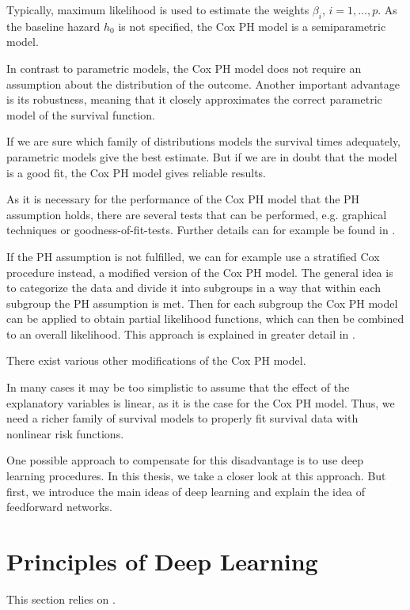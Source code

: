 \documentclass[12pt, a4paper]{scrartcl}
\theoremstyle{definition}
\theoremstyle{plain}
\numberwithin{equation}{section}
\numberwithin{figure}{section}
\numberwithin{table}{section}
\begin{document}
	Typically, maximum likelihood is used to estimate the weights $\beta_i$, $i=1,\dots ,p$.
	As the baseline hazard $h_0$ is not specified, the Cox PH model is a semiparametric model.
	
	In contrast to parametric models, the Cox PH model does not require an assumption about the distribution of the outcome.
	Another important advantage is its robustness, meaning that it closely approximates the correct parametric model of the survival function.
	
	If we are sure which family of distributions models the survival times adequately, parametric models give the best estimate.
	But if we are in doubt that the model is a good fit, the Cox PH model gives reliable results.
	
	As it is necessary for the performance of the Cox PH model that the PH assumption holds, there are several tests that can be performed, e.g. graphical techniques or goodness-of-fit-tests.
	Further details can for example be found in \citet*[Chapter~3]{sabook}.
	
	If the PH assumption is not fulfilled, we can for example use a stratified Cox procedure instead, a modified version of the Cox PH model.
	The general idea is to categorize the data and divide it into subgroups in a way that within each subgroup the PH assumption is met.
	Then for each subgroup the Cox PH model can be applied to obtain partial likelihood functions, which can then be combined to an overall likelihood.
	This approach is explained in greater detail in \citet*[Chapter~5]{sabook}.
	
	There exist various other modifications of the Cox PH model.
	
	In many cases it may be too simplistic to assume that the effect of the explanatory variables is linear, as it is the case for the Cox PH model.
	Thus, we need a richer family of survival models to properly fit survival data with nonlinear risk functions.
	
	One possible approach to compensate for this disadvantage is to use deep learning procedures.
	In this thesis, we take a closer look at this approach.
	But first, we introduce the main ideas of deep learning and explain the idea of feedforward networks.
	\newpage
	
	\section{Principles of Deep Learning}\label{basicsdl}
	This section relies on \citet*{deeplbook}.
	
\end{document}
